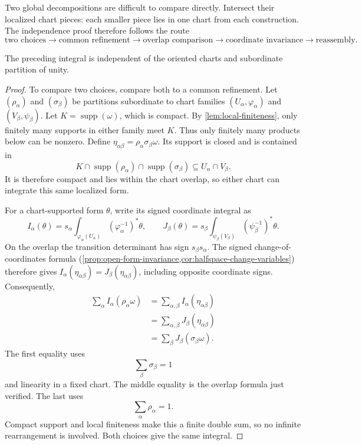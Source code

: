 Two global decompositions are difficult to compare directly. Intersect
their localized chart pieces: each smaller piece lies in one chart from
each construction. The independence proof therefore follows the route
\[
\text{two choices}\to\text{common refinement}\to\text{overlap comparison}
\to\text{coordinate invariance}\to\text{reassembly}.
\]
\begin{proposition}
\label{prop:manifold-integral-well-defined}
The preceding integral is independent of the oriented charts and subordinate
partition of unity.
\end{proposition}
\begin{proof}
To compare two choices, compare both to a common refinement. Let
$(\rho_\alpha)$ and $(\sigma_\beta)$ be partitions subordinate to chart
families $(U_\alpha,\varphi_\alpha)$ and $(V_\beta,\psi_\beta)$.
Let $K=\operatorname{supp}(\omega)$, which is compact. By
\cref{lem:local-finiteness}, only finitely many supports in either family
meet $K$. Thus only finitely many products below can be nonzero.
Define $\eta_{\alpha\beta}=\rho_\alpha\sigma_\beta\omega$. Its support
is closed and is contained in
\[
K\cap\operatorname{supp}(\rho_\alpha)\cap\operatorname{supp}(\sigma_\beta)
\subseteq U_\alpha\cap V_\beta.
\]
It is therefore compact and lies within the chart overlap, so either chart
can integrate this same localized form.

For a chart-supported form $\theta$, write its signed coordinate integral as
\[
I_\alpha(\theta)=s_\alpha\int_{\varphi_\alpha(U_\alpha)}
(\varphi_\alpha^{-1})^*\theta,\qquad
J_\beta(\theta)=s_\beta\int_{\psi_\beta(V_\beta)}
(\psi_\beta^{-1})^*\theta.
\]
On the overlap the transition determinant has sign $s_\beta s_\alpha$.
The signed change-of-coordinates formula
(\cref{prop:open-form-invariance,cor:halfspace-change-variables}) therefore
gives $I_\alpha(\eta_{\alpha\beta})=J_\beta(\eta_{\alpha\beta})$,
including opposite coordinate signs. Consequently,
\[
\begin{aligned}
\sum_\alpha I_\alpha(\rho_\alpha\omega)
&=\sum_{\alpha,\beta}I_\alpha(\eta_{\alpha\beta})\\
&=\sum_{\alpha,\beta}J_\beta(\eta_{\alpha\beta})\\
&=\sum_\beta J_\beta(\sigma_\beta\omega).
\end{aligned}
\]
The first equality uses
\[
\sum_\beta\sigma_\beta=1
\]
 and linearity in a
fixed chart. The middle equality is the overlap formula just verified.
The last uses
\[
\sum_\alpha\rho_\alpha=1.
\]
 Compact support and local
finiteness make this a finite double sum, so no infinite rearrangement
is involved. Both choices give the same integral.
\end{proof}

